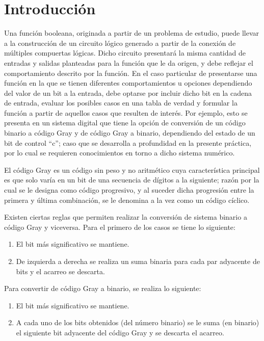 \documentclass[../main.tex]{subfiles}
\begin{document}
\clearpage
\section{Introducción}
Una función booleana, originada a partir de un problema de estudio, puede 
llevar a la construcción de un circuito lógico generado a partir de la 
conexión de múltiples compuertas lógicas. Dicho circuito presentará la misma 
cantidad de entradas y salidas planteadas para la función que le da origen, y 
debe reflejar el comportamiento descrito por la función. En el caso particular 
de presentarse una función en la que se tienen diferentes comportamientos u 
opciones dependiendo del valor de un bit a la entrada, debe optarse por 
incluir dicho bit en la cadena de entrada, evaluar los posibles casos en una 
tabla de verdad y formular la función a partir de aquellos casos que resulten 
de interés. Por ejemplo, esto se presenta en un sistema digital que tiene la 
opción de conversión de un código binario a código Gray y de código Gray a 
binario, dependiendo del estado de un bit de control ``c''; caso que se 
desarrolla a profundidad en la presente práctica, por lo cual se requieren 
conocimientos en torno a dicho sistema numérico.

El código Gray es un código sin peso y no aritmético cuya característica 
principal es que solo varía en un bit de una secuencia de dígitos a la 
siguiente; razón por la cual se le designa como código progresivo, y al 
suceder dicha progresión entre la primera y última combinación, se le 
denomina a la vez como un código cíclico.

Existen ciertas reglas que permiten realizar la conversión de sistema binario 
a código Gray y viceversa. Para el primero de los casos se tiene lo 
siguiente:

\begin{enumerate}
  \item El bit más significativo se mantiene.
  \item De izquierda a derecha se realiza un suma binaria para cada par 
    adyacente de bits y el acarreo se descarta.
\end{enumerate}

Para convertir de código Gray a binario, se realiza lo siguiente:
\begin{enumerate}
  \item El bit más significativo se mantiene.
  \item A cada uno de los bits obtenidos (del número binario) se le suma (en 
    binario) el siguiente bit adyacente del código Gray y se descarta el acarreo.
\end{enumerate}
\end{document}
